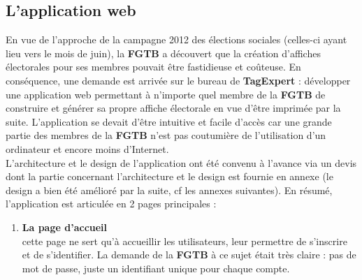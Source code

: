 \documentclass{article}
\begin{document}
\begin{sffamily}
\subsection{L'application web}

En vue de l'approche de la campagne 2012 des élections sociales (celles-ci ayant lieu vers le mois de juin), la \textbf{FGTB} a découvert que la 
création d'affiches électorales pour ses membres pouvait être fastidieuse et coûteuse. En conséquence, une demande est arrivée sur le bureau de 
\textbf{TagExpert} : développer une application web permettant à n'importe quel membre de la \textbf{FGTB} de construire et générer sa propre 
affiche électorale en vue d'être imprimée par la suite. L'application se devait d'être intuitive et facile d'accès car une grande partie des 
membres de la \textbf{FGTB} n'est pas coutumière de l'utilisation d'un ordinateur et encore moins d'Internet.\\

L'architecture et le design de l'application ont été convenu à l'avance via un devis dont la partie concernant l'architecture et le design est 
fournie en annexe (le design a bien été amélioré par la suite, cf les annexes suivantes). En résumé, l'application est articulée en 2 pages 
principales : 
\begin{enumerate}
\item \textbf{La page d'accueil} \\
cette page ne sert qu'à accueillir les utilisateurs, leur permettre de s'inscrire et de s'identifier.
La demande de la \textbf{FGTB} à ce sujet était très claire : pas de mot de passe, juste un identifiant unique pour chaque compte. \\


\end{enumerate}
\end{sffamily}
\end{document}
